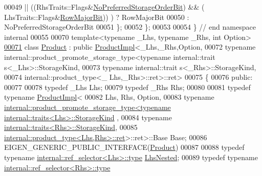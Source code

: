 \begin{DoxyCode}
00049              || ((RhsTraits::Flags&\hyperlink{group__flags_ga3c186ad80ddcf5e2ed3d7ee31cca1860}{NoPreferredStorageOrderBit}) && (
      LhsTraits::Flags&\hyperlink{group__flags_gae4f56c2a60bbe4bd2e44c5b19cbe8762}{RowMajorBit})) ) ? RowMajorBit
00050           : NoPreferredStorageOrderBit
00051   \};
00052 \};
00053 
00054 \} \textcolor{comment}{// end namespace internal}
00055 
00070 \textcolor{keyword}{template}<\textcolor{keyword}{typename} \_Lhs, \textcolor{keyword}{typename} \_Rhs, \textcolor{keywordtype}{int} Option>
\hyperlink{group___core___module}{00071} \textcolor{keyword}{class }\hyperlink{group___core___module_class_eigen_1_1_product}{Product} : \textcolor{keyword}{public} \hyperlink{class_eigen_1_1_product_impl}{ProductImpl}<\_Lhs,\_Rhs,Option,
00072                                    typename internal::product\_promote\_storage\_type<typename internal::trait
      s<\_Lhs>::StorageKind,
00073                                                                                    typename internal::trait
      s<\_Rhs>::StorageKind,
00074                                                                                    internal::product\_type<\_
      Lhs,\_Rhs>::ret>::ret>
00075 \{
00076   \textcolor{keyword}{public}:
00077     
00078     \textcolor{keyword}{typedef} \_Lhs Lhs;
00079     \textcolor{keyword}{typedef} \_Rhs Rhs;
00080     
00081     \textcolor{keyword}{typedef} \textcolor{keyword}{typename} \hyperlink{class_eigen_1_1_product_impl}{ProductImpl}<
00082         Lhs, Rhs, Option,
00083         \textcolor{keyword}{typename} 
      \hyperlink{struct_eigen_1_1internal_1_1product__promote__storage__type}{internal::product\_promote\_storage\_type<typename internal::traits<Lhs>::StorageKind}
      ,
00084                                                         \textcolor{keyword}{typename} 
      \hyperlink{struct_eigen_1_1internal_1_1traits}{internal::traits<Rhs>::StorageKind},
00085                                                         
      \hyperlink{struct_eigen_1_1internal_1_1product__type}{internal::product\_type<Lhs,Rhs>::ret}>::ret>::Base Base;
00086     EIGEN\_GENERIC\_PUBLIC\_INTERFACE(\hyperlink{group___core___module_class_eigen_1_1_product}{Product})
00087 
00088     \textcolor{keyword}{typedef} \textcolor{keyword}{typename} \hyperlink{class_eigen_1_1internal_1_1_tensor_lazy_evaluator_writable}{internal::ref\_selector<Lhs>::type} 
      \hyperlink{class_eigen_1_1internal_1_1_tensor_lazy_evaluator_writable}{LhsNested};
00089     \textcolor{keyword}{typedef} \textcolor{keyword}{typename} \hyperlink{class_eigen_1_1internal_1_1_tensor_lazy_evaluator_writable}{internal::ref\_selector<Rhs>::type} 

\end{DoxyCode}
